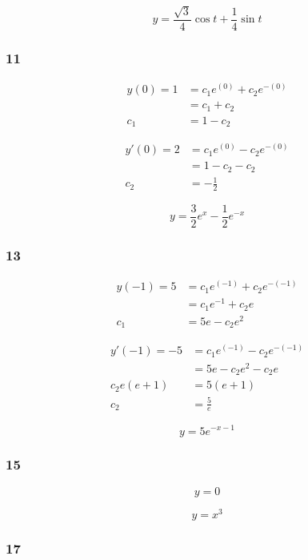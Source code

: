 \documentclass{article}
\begin{document}
\[y = \frac{\sqrt{3}}{4} \cos t + \frac{1}{4} \sin t\]

\subsubsection{11}

\begin{align*}
  y(0) = 1 & = c_1 e^{(0)} + c_2 e^{-(0)} \\
           & = c_1 + c_2                  \\
  c_1      & = 1 - c_2
\end{align*}

\begin{align*}
  y'(0) = 2 & = c_1 e^{(0)} - c_2 e^{-(0)} \\
            & = 1 - c_2 - c_2              \\
  c_2       & = -\frac{1}{2}
\end{align*}

\[y = \frac{3}{2} e^x - \frac{1}{2} e^{-x}\]

\subsubsection{13}

\begin{align*}
  y(-1) = 5 & = c_1 e^{(-1)} + c_2 e^{-(-1)} \\
            & = c_1 e^{-1} + c_2 e           \\
  c_1       & = 5 e - c_2 e^2
\end{align*}

\begin{align*}
  y'(-1) = -5   & = c_1 e^{(-1)} - c_2 e^{-(-1)} \\
                & = 5 e - c_2 e^2 - c_2 e        \\
  c_2 e (e + 1) & = 5 (e + 1)                    \\
  c_2           & = \frac{5}{e}
\end{align*}

\[y = 5 e^{-x - 1}\]

\subsubsection{15}

\[y = 0\]

\[y = x^3\]

\subsubsection{17}
\end{document}
